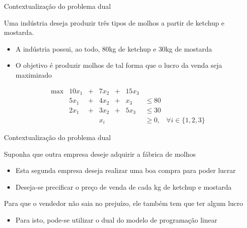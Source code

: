 \documentclass[compress,mathserif]{beamer}
\begin{document}
\begin{frame}{Contextualização do problema dual}

Uma indústria deseja produzir três tipos de molhos a partir de ketchup e mostarda. 
\begin{itemize}
    \item A indústria possui, ao todo, 80kg de ketchup e 30kg de mostarda
    \item O objetivo é produzir molhos de tal forma que o lucro da venda seja maximizado
\end{itemize}

$$\begin{matrix}
        \max & 10x_1 & + & 7x_2 & + & 15x_3 \\ 
             & 5x_1 & + & 4x_2 & + & x_3 & \leq 80 \\
             & 2x_1 & + & 3x_2 & + & 5x_3& \leq 30 \\
             & & & x_i & & & \geq 0, & \forall i \in \{1, 2, 3\}
        \end{matrix}    
$$

\end{frame}


\begin{frame}{Contextualização do problema dual}

Suponha que outra empresa deseje adquirir a fábrica de molhos
\begin{itemize}
    \item Esta segunda empresa deseja realizar uma boa compra para poder lucrar
    \item Deseja-se precificar o preço de venda de cada kg de ketchup e mostarda
\end{itemize}

\vspace{0.5cm}

Para que o vendedor não saia no prejuízo, ele também tem que ter algum lucro
\begin{itemize}
    \item Para isto, pode-se utilizar o dual do modelo de programação linear
\end{itemize}

\end{frame}

\end{document}
